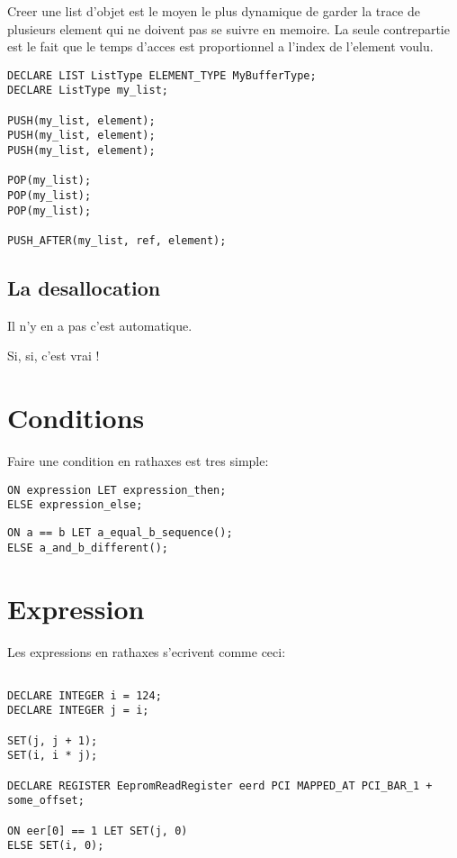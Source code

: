 \documentclass{rtxreport}
\begin{document}
Creer une list d'objet est le moyen le plus dynamique de garder la trace
de plusieurs element qui ne doivent pas se suivre en memoire.
La seule contrepartie est le fait que le temps d'acces est proportionnel
a l'index de l'element voulu.

\begin{lstlisting}
DECLARE LIST ListType ELEMENT_TYPE MyBufferType;
DECLARE ListType my_list;

PUSH(my_list, element);
PUSH(my_list, element);
PUSH(my_list, element);

POP(my_list);
POP(my_list);
POP(my_list);

PUSH_AFTER(my_list, ref, element);
\end{lstlisting}



\subsection{La desallocation}
Il n'y en a pas c'est automatique.

Si, si, c'est vrai !

\section{Conditions}

Faire une condition en rathaxes est tres simple:
\begin{lstlisting}[caption=Syntaxe des conditions]
ON expression LET expression_then;
ELSE expression_else;
\end{lstlisting}

\begin{lstlisting}[caption=Exemple de condition]
ON a == b LET a_equal_b_sequence();
ELSE a_and_b_different();
\end{lstlisting}


\section{Expression}
Les expressions en rathaxes s'ecrivent comme ceci:
\begin{lstlisting}[caption=Ecriture des expressions]

DECLARE INTEGER i = 124;
DECLARE INTEGER j = i;

SET(j, j + 1);
SET(i, i * j);

DECLARE REGISTER EepromReadRegister eerd PCI MAPPED_AT PCI_BAR_1 + some_offset;

ON eer[0] == 1 LET SET(j, 0)
ELSE SET(i, 0);

\end{lstlisting}
\end{document}

